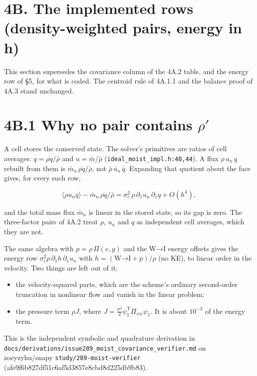 \documentclass[11pt,a4paper]{article}
\begin{document}
\section*{4B. The implemented rows (density-weighted pairs, energy in h)}

This section supersedes the covariance column of the 4A.2 table, and the
energy row of §5, for what is coded. The centroid rule of 4A.1.1 and the
balance proof of 4A.3 stand unchanged.

\section*{4B.1 Why no pair contains $\rho'$}

A cell stores the conserved state. The solver's primitives are ratios of cell
averages: $q=\overline{\rho q}/\bar\rho$ and $u=\bar m/\bar\rho$
(\texttt{ideal\_moist\_impl.h:40,44}). A flux $\rho\,u_n\,q$ rebuilt from them is
$\bar m_n\,\overline{\rho q}/\bar\rho$, not $\bar\rho\,\bar u_n\,\bar q$.
Expanding that quotient about the face gives, for every such row,

\begin{equation*}
\langle\rho u_n q\rangle-\bar m_n\,\overline{\rho q}/\bar\rho
=\sigma_c^2\,\rho\,\partial_1u_n\,\partial_1q+O(h^4),
\end{equation*}

and the total mass flux $\bar m_n$ is linear in the stored state, so its gap is
zero. The three-factor pairs of 4A.2 treat $\rho$, $u_n$ and $q$ as independent
cell averages, which they are not.

The same algebra with $p=\rho\,\Pi(e,y)$ and the W→I energy offsets gives the
energy row $\sigma_c^2\rho\,\partial_1h\,\partial_1u_n$ with
$h=(\text{W→I}+p)/\rho$ (no KE), to linear order in the velocity. Two things are
left out of it:
\begin{itemize}
\item the velocity-squared parts, which are the scheme's ordinary second-order
  truncation in nonlinear flow and vanish in the linear problem;
\item the pressure term $\rho J$, where $J=\tfrac{\sigma^2}{2}\psi_1^{\mathsf T}\Pi_{\psi\psi}\psi_1$.
  It is about $10^{-3}$ of the energy term.
\end{itemize}

This is the independent symbolic and quadrature derivation in
\texttt{docs/derivations/issue289\_moist\_covariance\_verifier.md} on zoeyzyhu/snapy
\texttt{study/289-moist-verifier} (afe9f6b827df51c6af5d3857e8cbd8d225db9b83).
\end{document}
